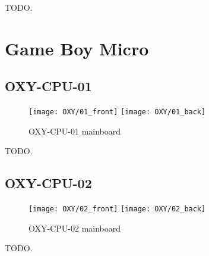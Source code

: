 TODO.

\section{Game Boy Micro}

\subsection{OXY-CPU-01}

\begin{figure}[H]
  \centering
  \texttt{[image: OXY/01\_front]}
  \texttt{[image: OXY/01\_back]}
  \caption{OXY-CPU-01 mainboard}
\end{figure}

TODO.

\subsection{OXY-CPU-02}

\begin{figure}[H]
  \centering
  \texttt{[image: OXY/02\_front]}
  \texttt{[image: OXY/02\_back]}
  \caption{OXY-CPU-02 mainboard}
\end{figure}

TODO.
